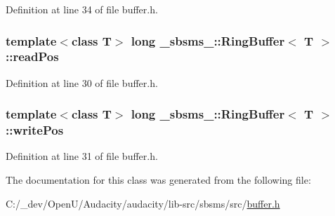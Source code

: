 Definition at line 34 of file buffer.\+h.

\subsubsection[{\texorpdfstring{read\+Pos}{readPos}}]{\setlength{\rightskip}{0pt plus 5cm}template$<$class T$>$ long {\bf \+\_\+sbsms\+\_\+\+::\+Ring\+Buffer}$<$ {\bf T} $>$\+::read\+Pos}\hypertarget{class__sbsms___1_1_ring_buffer_afc6f095d180483226c95db43160add65}{}\label{class__sbsms___1_1_ring_buffer_afc6f095d180483226c95db43160add65}


Definition at line 30 of file buffer.\+h.

\subsubsection[{\texorpdfstring{write\+Pos}{writePos}}]{\setlength{\rightskip}{0pt plus 5cm}template$<$class T$>$ long {\bf \+\_\+sbsms\+\_\+\+::\+Ring\+Buffer}$<$ {\bf T} $>$\+::write\+Pos}\hypertarget{class__sbsms___1_1_ring_buffer_a6ec6fb5c1069249c4bcc04610a1bf109}{}\label{class__sbsms___1_1_ring_buffer_a6ec6fb5c1069249c4bcc04610a1bf109}


Definition at line 31 of file buffer.\+h.



The documentation for this class was generated from the following file\+:\begin{DoxyCompactItemize}
\item 
C\+:/\+\_\+dev/\+Open\+U/\+Audacity/audacity/lib-\/src/sbsms/src/\hyperlink{sbsms_2src_2buffer_8h}{buffer.\+h}\end{DoxyCompactItemize}
